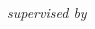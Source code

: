 
\begin{titlepage}

\begin{addmargin}[0cm]{0cm}
\begin{center}
\large

\hfill
\vfill

{} \\  \\ \bigskip %

\spacedlowsmallcaps{\myName} \\  \medskip %
\small\textit{supervised by} \\
\normalsize \spacedlowsmallcaps{\mySupervisor}

\vfill

\mySubtitle \\ \bigskip %
\myDepartment \\
\myUni \\ \bigskip

\myTime

\vfill

\end{center}
\end{addmargin}

\end{titlepage}